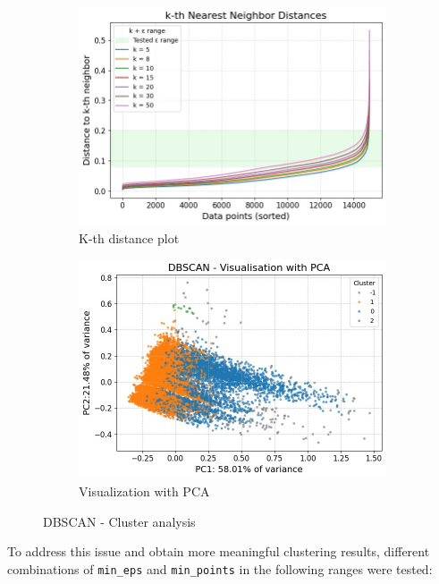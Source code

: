 \begin{figure}[H]
    \centering
    \begin{subfigure}[b]{0.44\textwidth}
        \centering
        \includegraphics[width=\textwidth]{plots/dbscan_kth.png}
        \caption{K-th distance plot}
        \label{fig:dbscan_kth}
    \end{subfigure}
    \begin{subfigure}[b]{0.44\textwidth}
        \centering
        \includegraphics[width=\textwidth]{plots/dbscan_scatterplot.png}
        \caption{Visualization with PCA}
        \label{fig:dbscan_visualization}
    \end{subfigure}
    \caption{DBSCAN - Cluster analysis}
    \label{fig:subplots_DBSCAN}
\end{figure}
To address this issue and obtain more meaningful clustering results, different combinations of \texttt{min\_eps} and \texttt{min\_points} in the following ranges were tested:
